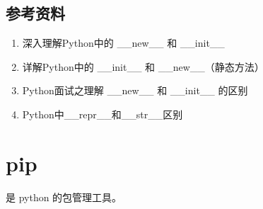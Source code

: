 \documentclass[letterpaper,10pt,english]{sphinxmanual}
\begin{document}
\subsection{参考资料}
\label{\detokenize{python/16_newInit:id6}}\begin{enumerate}
\item {} 
深入理解Python中的 \_\_new\_\_ 和 \_\_init\_\_

\end{enumerate}
\begin{quote}

\end{quote}
\begin{enumerate}
\setcounter{enumi}{1}
\item {} 
详解Python中的 \_\_init\_\_ 和 \_\_new\_\_（静态方法）

\end{enumerate}
\begin{quote}

\end{quote}
\begin{enumerate}
\setcounter{enumi}{2}
\item {} 
Python面试之理解 \_\_new\_\_ 和 \_\_init\_\_ 的区别

\end{enumerate}
\begin{quote}

\end{quote}
\begin{enumerate}
\setcounter{enumi}{3}
\item {} 
Python中\_\_repr\_\_和\_\_str\_\_区别

\end{enumerate}
\begin{quote}

\end{quote}


\section{pip}
\label{\detokenize{python/17_pip:pip}}\label{\detokenize{python/17_pip::doc}}
 是 python 的包管理工具。
\end{document}
